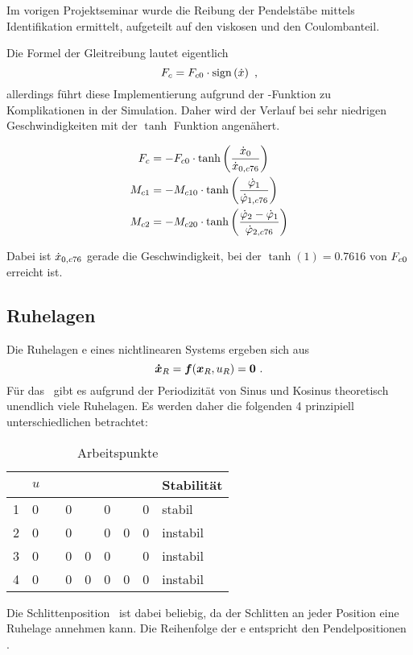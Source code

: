 Im vorigen Projektseminar \cite{ribeiro} wurde die Reibung der Pendelstäbe mittels Identifikation ermittelt, aufgeteilt auf den viskosen und den Coulombanteil.

Die Formel der Gleitreibung lautet eigentlich 
	\[
	F_c = F_{c0}  \cdot  \mathrm{sign}\left(\dot{x}\right) \ ,
\]
allerdings führt diese Implementierung aufgrund der -Funktion zu Komplikationen in der Simulation. 
Daher wird der Verlauf bei sehr niedrigen Geschwindigkeiten mit der $\tanh$ Funktion angenähert.

\begin{align}
	F_c  &= -F_{c0}  \cdot \tanh{\left(\frac{\ensuremath{\dot{x}_0}}{\ensuremath{\dot{x}_{0,c76}}}\right)}  \\
	M_{c1} &= -M_{c10} \cdot \tanh{\left(\frac{\ensuremath{\dot{\varphi}_1}}{\ensuremath{\dot{\varphi}_{1,c76}}}\right)}  \\
	M_{c2} &= -M_{c20} \cdot \tanh{\left(\frac{\ensuremath{\dot{\varphi}_2}-\ensuremath{\dot{\varphi}_1}}{\ensuremath{\dot{\varphi}_{2,c76}}}\right)}
\end{align}

Dabei ist $\dot{x}_{0,c76}$ gerade die Geschwindigkeit, bei der $\tanh(1)=0.7616$ von $F_{c0}$ erreicht ist.





\subsection{Ruhelagen}\label{sec:aps}

Die Ruhelagen \bzw \ap e eines nichtlinearen Systems ergeben sich aus
	\[
	\vexp_R = \ve{f}(\vex_R,u_R) = \ve{0}  \ .
\]
Für das \spds\ gibt es aufgrund der Periodizität von Sinus und Kosinus theoretisch unendlich viele Ruhelagen. Es werden daher die folgenden 4 prinzipiell unterschiedlichen betrachtet:
\begin{table}[h]
	\centering
		\begin{tabular}{lllllllll}
		\toprule
			\ap  & $u$ & \xo & \xop & \phe & \phep & \phz & \phzp & Stabilität  \\
			\midrule
			1	&	0 &	\xor	&	0	&	\pii	&	0	&	\pii	&	0	& stabil  \\
			2	&	0 &	\xor	&	0	&	\pii	&	0	&	0			&	0	& instabil  \\
			3	&	0 &	\xor	&	0	&	0			&	0	&	\pii	&	0	& instabil  \\
			4	&	0 &	\xor	&	0	&	0			&	0	&	0			&	0	& instabil  \\
			\bottomrule
		\end{tabular}
	\caption{Arbeitspunkte}
	\label{tab:aps}
\end{table}

Die Schlittenposition \xo\ ist dabei beliebig, da der Schlitten an jeder Position eine Ruhelage annehmen kann.
Die Reihenfolge der \ap e entspricht den Pendelpositionen .


